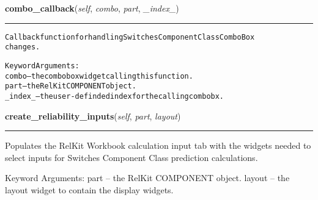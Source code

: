     \label{reliafree:switches:switch:Switch:combo_callback}

    \vspace{0.5ex}

\hspace{.8\funcindent}\begin{boxedminipage}{\funcwidth}

    \raggedright \textbf{combo\_callback}(\textit{self}, \textit{combo}, \textit{part}, \textit{\_index\_})

    \vspace{-1.5ex}

    \rule{\textwidth}{0.5\fboxrule}
\setlength{\parskip}{2ex}
\begin{alltt}
Callback function for handling Switches Component Class ComboBox
changes.

Keyword Arguments:
  combo -- the combobox widget calling this function.
   part -- the RelKit COMPONENT object.
\_index\_ -- the user-definded index for the calling combobx.
\end{alltt}

\setlength{\parskip}{1ex}
    \end{boxedminipage}

    \label{reliafree:switches:switch:Switch:create_reliability_inputs}

    \vspace{0.5ex}

\hspace{.8\funcindent}\begin{boxedminipage}{\funcwidth}

    \raggedright \textbf{create\_reliability\_inputs}(\textit{self}, \textit{part}, \textit{layout})

    \vspace{-1.5ex}

    \rule{\textwidth}{0.5\fboxrule}
\setlength{\parskip}{2ex}
    Populates the RelKit Workbook calculation input tab with the widgets
    needed to select inputs for Switches Component Class prediction 
    calculations.

    Keyword Arguments: part   -- the RelKit COMPONENT object. layout -- 
    the layout widget to contain the display widgets.

\setlength{\parskip}{1ex}
    \end{boxedminipage}

